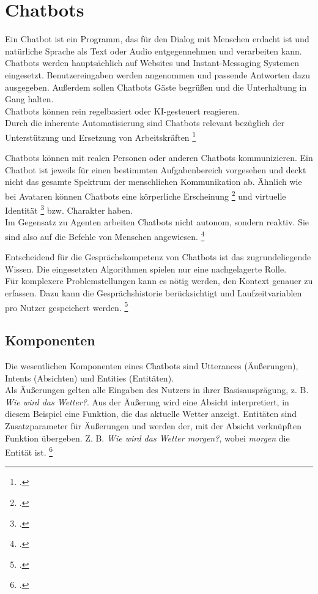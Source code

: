 \section{Chatbots}
Ein Chatbot ist ein Programm, das für den Dialog mit Menschen erdacht ist und natürliche Sprache als Text oder Audio entgegennehmen und verarbeiten kann.
Chatbots werden hauptsächlich auf Websites und Instant-Messaging Systemen eingesetzt.
Benutzereingaben werden angenommen und passende Antworten dazu ausgegeben. Außerdem sollen Chatbots Gäste begrüßen und die Unterhaltung in Gang halten.\\
Chatbots können rein regelbasiert oder \acf{KI}-gesteuert reagieren.\\
Durch die inherente Automatisierung sind Chatbots relevant bezüglich der \glqq{}Unterstützung und Ersetzung von Arbeitskräften\grqq
\footcites[][o. \pno]{Bendel_2018_Chatbot_Definition}[Vgl.][o. \pno]{Bendel_2018_Chatbot_Definition}

Chatbots können mit realen Personen oder anderen Chatbots kommunizieren. Ein Chatbot ist jeweils für einen bestimmten Aufgabenbereich vorgesehen und deckt nicht das gesamte Spektrum der menschlichen Kommunikation ab. Ähnlich wie bei Avataren können Chatbots eine \glqq{}körperliche Erscheinung\grqq
\footcite[][71\psq]{de_Vries_2006}
und \glqq{}virtuelle Identität\grqq
\footcite[][71\psq]{de_Vries_2006}
bzw. Charakter haben.\\

Im Gegensatz zu Agenten arbeiten Chatbots nicht autonom, sondern reaktiv. Sie sind also auf die Befehle von Menschen angewiesen.
\footcite[Vgl.][69\psqq]{de_Vries_2006}

Entscheidend für die Gesprächskompetenz von Chatbots ist das zugrundeliegende Wissen. Die eingesetzten Algorithmen spielen nur eine nachgelagerte Rolle.\\
Für komplexere Problemstellungen  kann es nötig werden, den Kontext genauer zu erfassen. Dazu kann die Gesprächshistorie berücksichtigt und Laufzeitvariablen pro Nutzer gespeichert werden.
\footcite[Vgl.][82\psq]{Feindt_2006_Agenten}

\subsection{Komponenten}
Die wesentlichen Komponenten eines Chatbots sind Utterances (Äußerungen), Intents (Absichten) und Entities (Entitäten).\\
Als Äußerungen gelten alle Eingaben des Nutzers in ihrer Basisausprägung, z. B. \textit{Wie wird das Wetter?}.
Aus der Äußerung wird eine Absicht interpretiert, in diesem Beispiel eine Funktion, die das aktuelle Wetter anzeigt.
Entitäten sind Zusatzparameter für Äußerungen und werden der, mit der Absicht verknüpften Funktion übergeben. Z. B. \textit{Wie wird das Wetter morgen?}, wobei \textit{morgen} die Entität ist.
\footcite[Vgl.][51]{Groetz_2018_Sprich_mit_mir}

